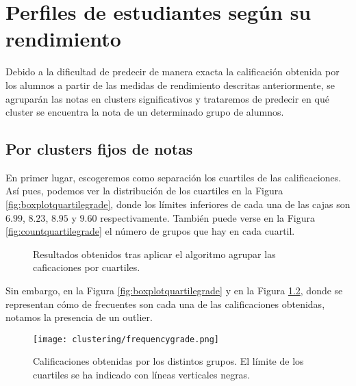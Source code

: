 \chapter{Perfiles de estudiantes según su rendimiento}\label{sec:chapterXII}

Debido a la dificultad de predecir de manera exacta la calificación obtenida por los alumnos a partir de las medidas de rendimiento descritas anteriormente, se agruparán las notas en clusters significativos y trataremos de predecir en qué cluster se encuentra la nota de un determinado grupo de alumnos.

\section{Por clusters fijos de notas}

En primer lugar, escogeremos como separación los cuartiles de las calificaciones. Así pues, podemos ver la distribución de los cuartiles en la Figura \ref{fig:boxplotquartilegrade}, donde los límites inferiores de cada una de las cajas son $6.99$, $8.23$, $8.95$ y $9.60$ respectivamente. También puede verse en la Figura \ref{fig:countquartilegrade} el número de grupos que hay en cada cuartil.


\begin{figure}[H]
\centering
{}\qquad
{}%
\caption{Resultados obtenidos tras aplicar el algoritmo agrupar las caficaciones por cuartiles.}
\label{fig:quartilegradeclustering}
\end{figure}

Sin embargo, en la Figura \ref{fig:boxplotquartilegrade} y en la Figura \ref{fig:frequenciesgrade}, donde se representan cómo de frecuentes son cada una de las calificaciones obtenidas, notamos la presencia de un outlier.

\begin{figure}[H]
    \centering
    \texttt{[image: clustering/frequencygrade.png]}
    \caption{Calificaciones obtenidas por los distintos grupos. El límite de los cuartiles se ha indicado con líneas verticales negras.}
    \label{fig:frequenciesgrade}
\end{figure}

